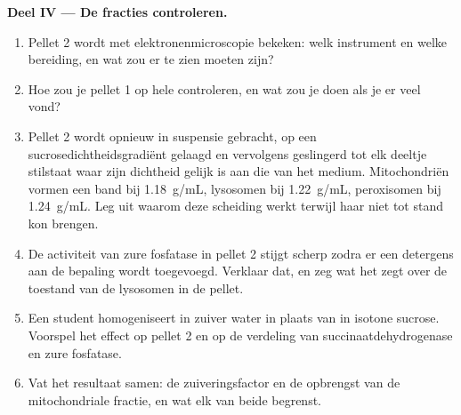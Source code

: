 \begin{problem}
\medskip
\noindent\textbf{Deel IV --- De fracties controleren.}
\begin{enumerate}[resume]
  \item Pellet 2 wordt met elektronenmicroscopie bekeken: welk instrument
        en welke bereiding, en wat zou er te zien moeten zijn?
  \item Hoe zou je pellet 1 op hele  controleren, en wat zou je doen
        als je er veel vond?
  \item Pellet 2 wordt opnieuw in suspensie gebracht, op een
        sucrosedichtheidsgradiënt gelaagd en vervolgens geslingerd tot elk
        deeltje stilstaat waar zijn dichtheid gelijk is aan die van het
        medium. Mitochondriën vormen een band bij \qty{1.18}{g/mL},
        lysosomen bij \qty{1.22}{g/mL}, peroxisomen bij \qty{1.24}{g/mL}.
        Leg uit waarom deze scheiding werkt terwijl  haar niet tot stand kon brengen.
  \item De activiteit van zure fosfatase in pellet 2 stijgt scherp zodra
        er een detergens aan de bepaling wordt toegevoegd. Verklaar dat,
        en zeg wat het zegt over de toestand van de lysosomen in de
        pellet.
  \item Een student homogeniseert in zuiver water in plaats van in isotone
        sucrose. Voorspel het effect op pellet 2 en op de verdeling van
        succinaatdehydrogenase en zure fosfatase.
  \item Vat het resultaat samen: de zuiveringsfactor en de opbrengst van
        de mitochondriale fractie, en wat elk van beide begrenst.
\end{enumerate}
\end{problem}
